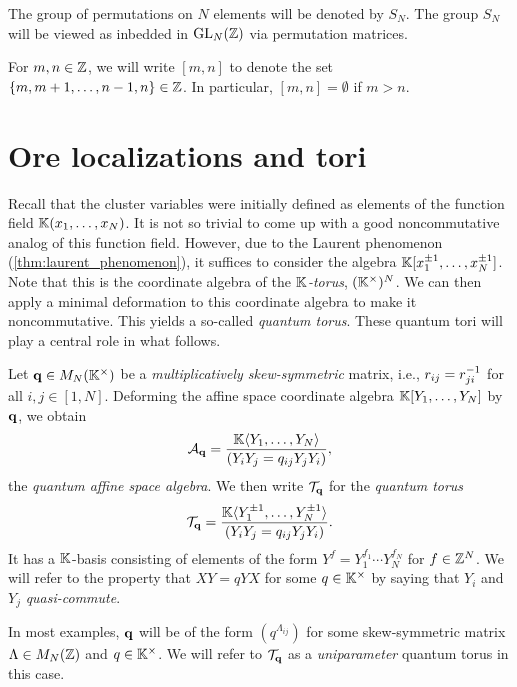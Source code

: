 The group of permutations on $N$ elements will be denoted by $S_N$. The group $S_N$ will be viewed as inbedded in $\operatorname{GL}_N(\mathbb{Z})$ via permutation matrices.

For $m, n \in \mathbb{Z}$, we will write $[m, n]$ to denote the set $\{m, m+1, \dots, n-1,
	n\} \in \mathbb{Z}$. In particular, $[m, n] = \emptyset$ if $m > n$.

\section{Ore localizations and tori}

Recall that the cluster variables were initially defined as elements of the function
field $\mathbb{K}(x_1, \dots, x_N)$. It is not so trivial to come up with a good
noncommutative analog of this function field. However, due to the Laurent phenomenon
(\cref{thm:laurent_phenomenon}), it suffices to consider the algebra $\mathbb{K}[x_1^{\pm 1},
	\dots, x_N^{\pm 1}]$. Note that this is the coordinate algebra of the
\emph{$\mathbb{K}$-torus}, $(\mathbb{K}^\times)^N$. We can then apply a minimal
deformation to this coordinate algebra to make it noncommutative. This yields a
so-called \emph{quantum torus}. These quantum tori will play a
central role in what follows.

Let $\mathbf{q} \in M_N(\mathbb{K}^\times)$ be a \emph{multiplicatively
	skew-symmetric} matrix, i.e., $r_{ij} =
	r_{ji}^{-1}$ for all $i,j \in [1, N]$. Deforming the affine space coordinate algebra
$\mathbb{K}[Y_1, \dots, Y_N]$ by $\mathbf{q}$, we obtain
\begin{equation*}
	\mathcal{A}_{\mathbf{q}} = \frac{\mathbb{K} \langle Y_1 , \dots, Y_N\rangle}{(Y_i Y_j = q_{ij}Y_j Y_i)},
\end{equation*}
the \emph{quantum affine space algebra}. We then write $\mathcal{T}_{\mathbf{q}}$ for the \emph{quantum torus}
\begin{equation}\label{eq:quantum_torus}
	\mathcal{T}_{\mathbf{q}} = \frac{\mathbb{K} \langle Y_1^{\pm 1} , \dots, Y_N^{\pm 1}\rangle}{(Y_i Y_j = q_{ij}Y_j Y_i)}.
\end{equation}
%
It has a $\mathbb{K}$-basis consisting of elements of the form $Y^f = Y_1^{f_1} \cdots
	Y_N^{f_N}$ for $f \in \mathbb{Z}^N$. We will refer to the property that $X Y = qY X$ for some
$q \in \mathbb{K}^\times$ by saying that $Y_i$ and $Y_j$
\emph{quasi-commute}.
\begin{remark}

	In most examples, $\mathbf{q}$ will be of the form $(q^{\Lambda_{ij}})$ for some
	skew-symmetric matrix $\Lambda \in M_N(\mathbb{Z})$ and $q\in \mathbb{K}^\times$. We will refer to
	$\mathcal{T}_{\mathbf{q}}$ as a \emph{uniparameter} quantum torus in this case.
\end{remark}
%

